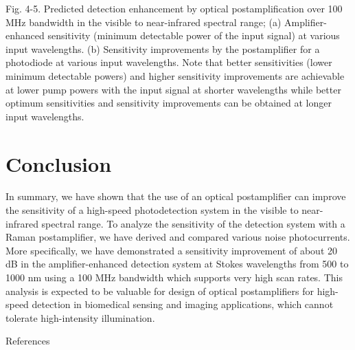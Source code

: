 Fig. 4-5. Predicted detection enhancement by optical postamplification over 100 MHz bandwidth in the visible to near-infrared spectral range; (a) Amplifier-enhanced sensitivity (minimum detectable power of the input signal) at various input wavelengths. (b) Sensitivity improvements by the postamplifier for a photodiode at various input wavelengths. Note that better sensitivities (lower minimum detectable powers) and higher sensitivity improvements are achievable at lower pump powers with the input signal at shorter wavelengths while better optimum sensitivities and sensitivity improvements can be obtained at longer input wavelengths.

\section{Conclusion}

In summary, we have shown that the use of an optical postamplifier can improve the sensitivity of a high-speed photodetection system in the visible to near-infrared spectral range. To analyze the sensitivity of the detection system with a Raman postamplifier, we have derived and compared various noise photocurrents. More specifically, we have demonstrated a sensitivity improvement of about 20 dB in the amplifier-enhanced detection system at Stokes wavelengths from 500 to 1000 nm using a 100 MHz bandwidth which supports very high scan rates. This analysis is expected to be valuable for design of optical postamplifiers for high-speed detection in biomedical sensing and imaging applications, which cannot tolerate high-intensity illumination.

References

